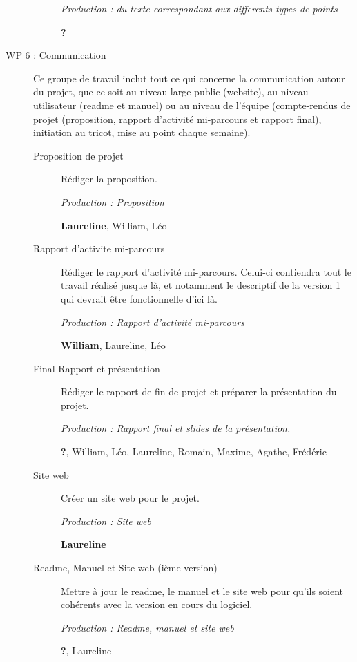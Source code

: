 \documentclass{article}
\begin{document}
\begin{description}
\begin{description}
    \textit{Production : du texte correspondant aux differents types de points}

    \textbf{?}
  \end{description}
\medskip

\item[WP 6 : Communication] Ce groupe de travail inclut tout ce qui concerne la communication autour du projet, que ce soit au niveau 
large public (website), au niveau utilisateur (readme et manuel) ou au niveau de l'équipe (compte-rendus de projet (proposition, rapport 
d'activité mi-parcours et rapport final), initiation au tricot, mise au point chaque semaine).


  \begin{description}
  \item[Proposition de projet] Rédiger la proposition.

    \textit{Production : Proposition}

    \textbf{Laureline}, William, Léo

  \item[Rapport d'activite mi-parcours] Rédiger le rapport d'activité mi-parcours. Celui-ci contiendra tout le travail réalisé jusque là, 
et notamment le descriptif de la version 1 qui devrait être fonctionnelle d'ici là.

    \textit{Production : Rapport d'activité mi-parcours}

    \textbf{William}, Laureline, Léo

  \item[Final Rapport et présentation] Rédiger le rapport de fin de projet et préparer la présentation du projet.

    \textit{Production : Rapport final et slides de la présentation.}

    \textbf{?}, William, Léo, Laureline, Romain, Maxime, Agathe, Frédéric

  \item[Site web] Créer un site web pour le projet. %

    \textit{Production : Site web}

    \textbf{Laureline}

  \item[Readme, Manuel et Site web (ième version)] Mettre à jour le readme, le manuel et le site web pour qu'ils soient cohérents avec la 
version en cours du logiciel.

    \textit{Production : Readme, manuel et site web}

    \textbf{?}, Laureline
  \end{description}

\medskip

\end{description}
\end{document}
